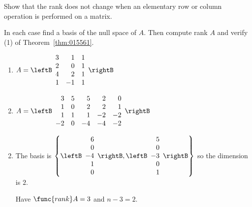 \begin{multicols}{2}
\begin{ex}
Show that the rank does not change when an elementary row or column operation is performed on a matrix.
\end{ex}

\begin{ex}
In each case find a basis of the null space of $A$. Then compute rank $A$ and verify (1) of Theorem~\ref{thm:015561}.

\begin{enumerate}[label={\alph*.}]
\item 
$A = \leftB \begin{array}{rrr}
3 & 1 & 1 \\
2 & 0 & 1 \\
4 & 2 & 1 \\
1 & -1 & 1
\end{array} \rightB$

\item 
$A = \leftB \begin{array}{rrrrr}
3 & 5 & 5 & 2 & 0 \\
1 & 0 & 2 & 2 & 1 \\
1 & 1 & 1 &-2 &-2 \\
-2& 0 &-4 &-4 &-2 \\
\end{array} \rightB$

\end{enumerate}
\begin{sol}
\begin{enumerate}[label={\alph*.}]
\setcounter{enumi}{1}
\item The basis is 
$\left\{
\leftB \begin{array}{r}
6\\
0\\
-4\\
1\\
0
\end{array} \rightB, \leftB \begin{array}{r}
5\\
0\\
-3\\
0\\
1
\end{array} \rightB
\right\}$ so the dimension is $2$.

Have $\func{rank} A = 3$ and $n - 3 = 2$.
\end{enumerate}
\end{sol}
\end{ex}




\end{multicols}
